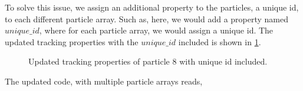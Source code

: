 To solve this issue, we assign an additional property to the particles, a unique
id, to each different particle array. Such as, here, we would add a property
named $unique\_id$, where for each particle array, we would assign a unique id.
The updated tracking properties with the $unique\_id$ included is shown in
\cref{fig:mb-ui-included}.
\begin{figure}[!htpb]
  \centering
  \caption{Updated tracking properties of particle $8$ with unique id included.}
\label{fig:mb-ui-included}
\end{figure}
The updated code, with multiple particle arrays reads,
 \lstset{basicstyle=\footnotesize\ttfamily}
